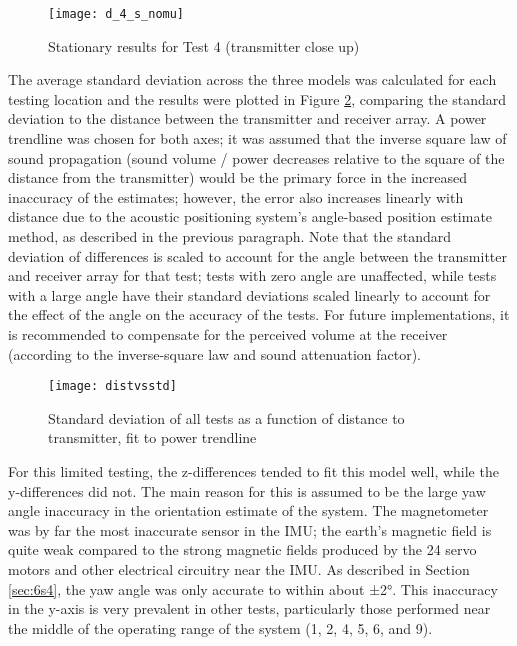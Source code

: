 \documentclass[12pt,a4paper]{report}
\begin{document}
\begin{figure}[htbp]
	\centering
	\texttt{[image: d\_4\_s\_nomu]}
	\caption{Stationary results for Test 4 (transmitter close up)}
	\label{fig:d_4_s_nomu}
\end{figure}

The average standard deviation across the three models was calculated for each testing location and the results were plotted in Figure \ref{fig:distvsstd}, comparing the standard deviation to the distance between the transmitter and receiver array. A power trendline was chosen for both axes; it was assumed that the inverse square law of sound propagation (sound volume / power decreases relative to the square of the distance from the transmitter) would be the primary force in the increased inaccuracy of the estimates; however, the error also increases linearly with distance due to the acoustic positioning system's angle-based position estimate method, as described in the previous paragraph. Note that the standard deviation of differences is scaled to account for the angle between the transmitter and receiver array for that test; tests with zero angle are unaffected, while tests with a large angle have their standard deviations scaled linearly to account for the effect of the angle on the accuracy of the tests. For future implementations, it is recommended to compensate for the perceived volume at the receiver (according to the inverse-square law and sound attenuation factor).

\begin{figure}[htbp]
	\centering
	\texttt{[image: distvsstd]}
	\caption{Standard deviation of all tests as a function of distance to transmitter, fit to power trendline}
	\label{fig:distvsstd}
\end{figure}

For this limited testing, the z-differences tended to fit this model well, while the y-differences did not. The main reason for this is assumed to be the large yaw angle inaccuracy in the orientation estimate of the system. The magnetometer was by far the most inaccurate sensor in the IMU; the earth’s magnetic field is quite weak compared to the strong magnetic fields produced by the 24 servo motors and other electrical circuitry near the IMU. As described in Section \ref{sec:6s4}, the yaw angle was only accurate to within about ±2°. This inaccuracy in the y-axis is very prevalent in other tests, particularly those performed near the middle of the operating range of the system (1, 2, 4, 5, 6, and 9).
\end{document}
